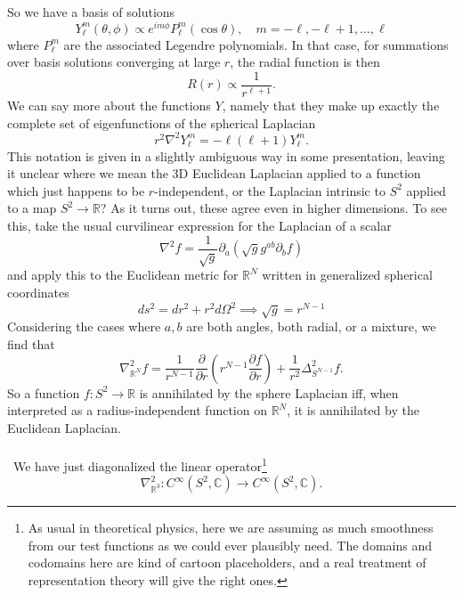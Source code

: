\documentclass[11pt,letterpaper]{article}
\newcommand{\LP}{\left(}
\newcommand{\RP}{\right)}
\newcommand{\R}{\mathbb{R}}
\newcommand{\C}{\mathbb{C}}
\newcommand{\D}{\partial}
\newcommand{\PA}[2]{\frac{\partial #1}{\partial #2}}
\begin{document}
So we have a basis of solutions \begin{equation}
Y_\ell^m (\theta, \phi) \propto e^{i m \phi} P_\ell^m (\cos \theta), \quad m = -\ell, - \ell + 1, \ldots, \ell
\end{equation}
where $P_\ell^m$ are the associated Legendre polynomials. In that case, for summations over basis solutions converging at large $r$, the radial function is then \begin{equation}
R(r) \propto \frac{1}{r^{\ell + 1}}.
\end{equation}
We can say more about the functions $Y$, namely that they make up exactly the complete set of  eigenfunctions of the spherical Laplacian \begin{equation}
r^2 \nabla^2 Y_\ell^m = - \ell(\ell + 1) Y_\ell^m.
\end{equation}
This notation is given in a slightly ambiguous way in some presentation, leaving it unclear where we mean the 3D Euclidean Laplacian applied to a function which just happens to be $r$-independent, or the Laplacian intrinsic to $S^2$ applied to a map $S^2 \to \R$? As it turns out, these agree even in higher dimensions. To see this, take the usual curvilinear expression for the Laplacian of a scalar \begin{equation}
\nabla^2 f = \frac{1}{\sqrt{g}} \D_a \LP \sqrt{g} g^{ab} \D_b f \RP
\end{equation}
and apply this to the Euclidean metric for $\R^N$ written in generalized spherical coordinates \begin{equation}
ds^2 = dr^2 + r^2 d \Omega^2 \implies \sqrt{g} = r^{N-1}
\end{equation}
Considering the cases where $a,b$ are both angles, both radial, or a mixture, we find that \begin{equation}
\nabla_{\R^N}^2 f = \frac{1}{r^{N-1}} \PA{}{r} \LP r^{N-1} \PA{f}{r} \RP + \frac{1}{r^2} \Delta^2_{S^{N-1}} f.
\end{equation}
So a function $f: S^2 \to \R$ is annihilated by the sphere Laplacian iff, when interpreted as a radius-independent function on $\R^N$, it is annihilated by the Euclidean Laplacian.\\
\\
\
We have just diagonalized the linear operator\footnote{As usual in theoretical physics, here we are assuming as much smoothness from our test functions as we could ever plausibly need. The domains and codomains here are kind of cartoon placeholders, and a real treatment of representation theory will give the right ones.} \begin{equation}
\nabla^2_{\R^3}: C^\infty(S^2, \C) \to C^\infty(S^2, \C).
\end{equation}
\end{document}
